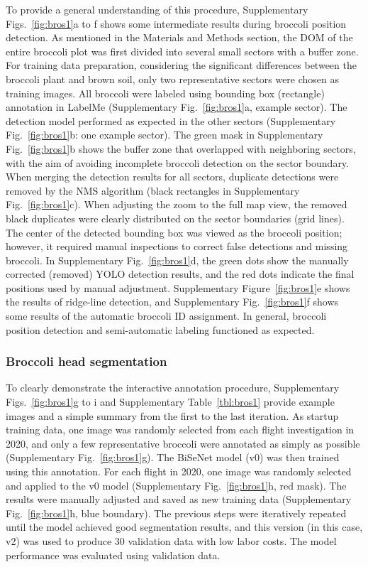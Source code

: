 To provide a general understanding of this procedure, Supplementary Figs.~\ref{fig:bros1}a to f shows some intermediate results during broccoli position detection. As mentioned in the Materials and Methods section, the DOM of the entire broccoli plot was first divided into several small sectors with a buffer zone. For training data preparation, considering the significant differences between the broccoli plant and brown soil, only two representative sectors were chosen as training images. All broccoli were labeled using bounding box (rectangle) annotation in LabelMe (Supplementary Fig.~\ref{fig:bros1}a, example sector). The detection model performed as expected in the other sectors (Supplementary Fig.~\ref{fig:bros1}b: one example sector). The green mask in Supplementary Fig.~\ref{fig:bros1}b shows the buffer zone that overlapped with neighboring sectors, with the aim of avoiding incomplete broccoli detection on the sector boundary. When merging the detection results for all sectors, duplicate detections were removed by the NMS algorithm (black rectangles in Supplementary Fig.~\ref{fig:bros1}c). When adjusting the zoom to the full map view, the removed black duplicates were clearly distributed on the sector boundaries (grid lines). The center of the detected bounding box was viewed as the broccoli position; however, it required manual inspections to correct false detections and missing broccoli. In Supplementary Fig.~\ref{fig:bros1}d, the green dots show the manually corrected (removed) YOLO detection results, and the red dots indicate the final positions used by manual adjustment. Supplementary Figure~\ref{fig:bros1}e shows the results of ridge-line detection, and Supplementary Fig.~\ref{fig:bros1}f shows some results of the automatic broccoli ID assignment. In general, broccoli position detection and semi-automatic labeling functioned as expected.

\subsubsection*{Broccoli head segmentation}

To clearly demonstrate the interactive annotation procedure, Supplementary \linebreak Figs.~\ref{fig:bros1}g to i and Supplementary Table~\ref{tbl:bros1} provide example images and a simple summary from the first to the last iteration. As startup training data, one image was randomly selected from each flight investigation in 2020, and only a few representative broccoli were annotated as simply as possible (Supplementary Fig.~\ref{fig:bros1}g). The BiSeNet model (v0) was then trained using this annotation. For each flight in 2020, one image was randomly selected and applied to the v0 model (Supplementary Fig.~\ref{fig:bros1}h, red mask). The results were manually adjusted and saved as new training data (Supplementary Fig.~\ref{fig:bros1}h, blue boundary). The previous steps were iteratively repeated until the model achieved good segmentation results, and this version (in this case, v2) was used to produce 30 validation data with low labor costs. The model performance was evaluated using validation data.

